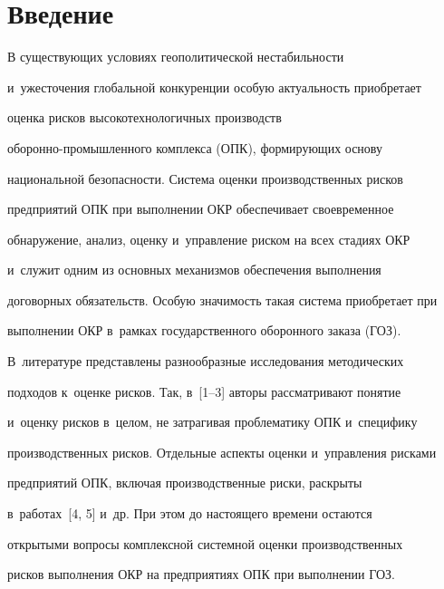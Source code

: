       


      


\section{Введение}





\vspace*{-2pt}





     В существующих условиях геополитической нестабильности 


и~ужесточения глобальной конкуренции особую актуальность приобретает 


оценка рисков высокотехнологичных производств  


обо\-рон\-но-про\-мыш\-лен\-но\-го комплекса (ОПК), формирующих основу 


национальной безопасности. Система оценки производственных рисков 


предприятий ОПК при выполнении ОКР обеспечивает своевременное 


обнаружение, анализ, оценку и~управ\-ле\-ние риском на всех стадиях ОКР 


и~служит одним из основных механизмов обеспечения выполнения 


договорных обязательств. Особую значимость такая система приобретает при 


выполнении ОКР в~рамках государственного оборонного заказа (ГОЗ). 


В~литературе пред\-став\-ле\-ны разнообразные исследования методических 


подходов к~оценке рисков. Так, в~[1--3] авторы рассматривают понятие 


и~оценку рисков в~целом, не затрагивая проблематику ОПК и~специфику 


производственных рисков. Отдельные аспекты оценки и~управления рисками 


предприятий ОПК, включая производственные риски, раскрыты 


в~работах~[4, 5] и~др. При этом до настоящего времени остаются 


открытыми вопросы комплексной сис\-тем\-ной оценки производственных 


рисков выполнения ОКР на предприятиях ОПК при выполнении ГОЗ.






